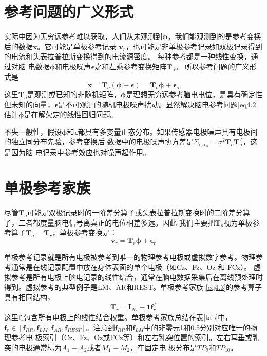 \section{参考问题的广义形式}
实际中因为无穷远参考难以获取，人们从未观测到$\mathbf{\phi}$，我们能观测到的是参考变换后的数据$\mathbf{x}$。它可能是单极参考记录
$\mathbf{v}_r$，也可能是非单极参考记录如双极记录得到的电流和头表拉普拉斯变换得到的电流源密度。 每种参考都是一种线性变换，通过对脑
电数据$\mathbf{\phi}$和电极噪声$\mathbf{\epsilon}$之和左乘参考变换矩阵$\mathbf{T}_o$。 所以参考问题的广义形式是
\begin{equation}\label{eq4.2}
\mathbf{x}=\mathbf{T}_{o}(\mathbf{\phi+\epsilon})=\mathbf{T}_{o}\mathbf{\phi}+\mathbf{\epsilon}_o
\end{equation}
这里$\mathbf{T}_o$是观测或已知的非随机矩阵，$\mathbf{\phi}$是理想无穷远参考脑电电位，是具有确定性但未知的向量，$\mathbf{\epsilon}$是不可观测的随机电极噪声扰动。显然解决脑电参考问题\eqref{eq4.2}估计$\mathbf{\phi}$是在解欠定的线性回归问题。 

不失一般性，假设$\mathbf{\phi}$和$\mathbf{\epsilon}$都具有多变量正态分布。如果传感器电极噪声具有电极间的独立同分布先验，参考变换后
数据中的电极噪声协方差是$\Sigma_{\mathbf{\epsilon}_o\mathbf{\epsilon}_o}=\sigma^2\mathbf{T}_{o}\mathbf{T}_{o}^T$，这是因为脑
电记录中参考效应也对噪声起作用。

\section{单极参考家族}
尽管$\mathbf{T}_{o}$可能是双极记录时的一阶差分算子或头表拉普拉斯变换时的二阶差分算子，二者都度量脑电信号离真正的电位相差多远。因此
我们主要把$\mathbf{T}_{o}$视为单极参考算子$\mathbf{T}_{o}=\mathbf{T}_{r}$，单极参考变换是：
\begin{equation}\label{eq4.3}
\mathbf{v}_{r}=\mathbf{T}_{r}\mathbf{\phi}+\mathbf{\epsilon}_r
\end{equation}

单极参考记录就是所有电极被参考到唯一的物理参考电极或虚拟数字参考。物理参考通常是在线记录配置中放在身体表面的单个电极（如Cz、Fz、Oz 和 FCz）。 虚拟参考是所有电极上脑电记录的线性结合，通常在脑电数据采集后在离线预处理时得到。虚拟参考的典型例子是LM、AR和REST。单极参考家族
\eqref{eq4.3}的参考算子具有相同结构，
\begin{equation}\label{eq4.4}
\mathbf{T}_{r}=\mathbf{I}_{N_c}-\mathbf{1f}_r^T
\end{equation}
这里$\mathbf{f}_r$包含所有电极上的线性结合权重。单极参考家族总结在表\ref{tab}中，$\mathbf{f}_r\in{[\mathbf{f}_{RR},\mathbf{f}_{LM},\mathbf{f}_{AR},\mathbf{f}_{REST}]}$。注意到$\mathbf{f}_{RR}$和$\mathbf{f}_{LM}$中的非零元1和0.5分别对应唯一的物理参考电
极索引（Cz、Fz、Oz或FCz等）和左右乳突位置的索引。左右耳垂或乳突的电极通常标为$A_1-A_2$或者$M_1-M_2$，在固定电
极分布是$TP_9$和$TP_{10}$。

